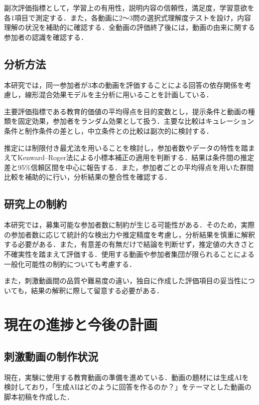 \documentclass[11pt]{ltjarticle}
\begin{document}
副次評価指標として，学習上の有用性，説明内容の信頼性，満足度，学習意欲を各1項目で測定する．また，各動画に2〜3問の選択式理解度テストを設け，内容理解の状況を補助的に確認する．全動画の評価終了後には，動画の由来に関する参加者の認識を確認する．

\subsection{分析方法}

本研究では，同一参加者が3本の動画を評価することによる回答の依存関係を考慮し，線形混合効果モデルを主分析に用いることを計画している\cite{baayen2008}．

主要評価指標である教育的価値の平均得点を目的変数とし，提示条件と動画の種類を固定効果，参加者をランダム効果として扱う．主要な比較はキュレーション条件と制作条件の差とし，中立条件との比較は副次的に検討する．

推定には制限付き最尤法を用いることを検討し，参加者数やデータの特性を踏まえてKenward--Roger法による小標本補正の適用を判断する\cite{luke2017}．結果は条件間の推定差と95\%信頼区間を中心に報告する．また，参加者ごとの平均得点を用いた群間比較を補助的に行い，分析結果の整合性を確認する．

\subsection{研究上の制約}

本研究では，募集可能な参加者数に制約が生じる可能性がある．そのため，実際の参加者数に応じて統計的な検出力や推定精度を考慮し，分析結果を慎重に解釈する必要がある\cite{lakens2022}．また，有意差の有無だけで結論を判断せず，推定値の大きさと不確実性を踏まえて評価する．使用する動画や参加者集団が限られることによる一般化可能性の制約についても考慮する．

また，刺激動画間の品質や難易度の違い，独自に作成した評価項目の妥当性についても，結果の解釈に際して留意する必要がある．

\section{現在の進捗と今後の計画}

\subsection{刺激動画の制作状況}

現在，実験に使用する教育動画の準備を進めている．動画の題材には生成AIを検討しており，「生成AIはどのように回答を作るのか？」をテーマとした動画の脚本初稿を作成した．
\end{document}
